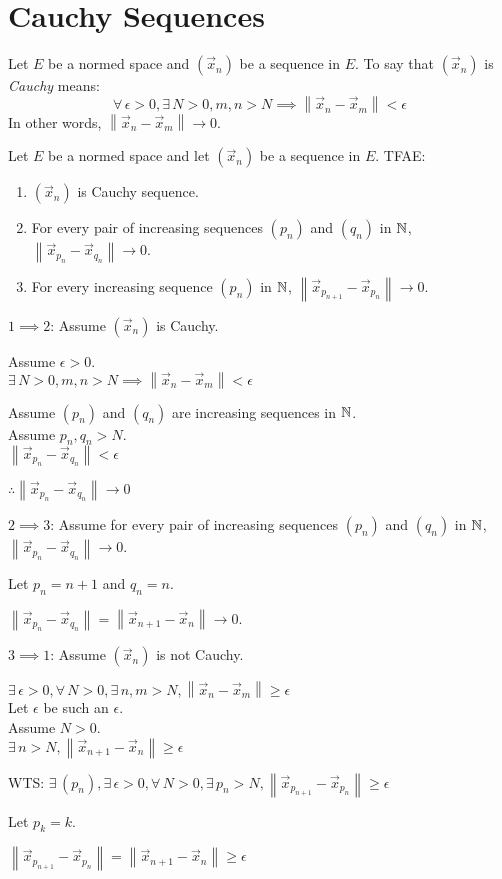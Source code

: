 \documentclass[letterpaper,12pt,fleqn]{article}
\newcommand{\vx}{\vec{x}}
\newcommand{\e}{\epsilon}
\newcommand{\norm}[1]{\left\|#1\right\|}
\begin{document}
\section*{Cauchy Sequences}

\begin{definition}[Cauchy]
  Let $E$ be a normed space and $(\vx_n)$ be a sequence in $E$. To say that
  $(\vx_n)$ is \emph{Cauchy} means:
  \[\forall\,\e>0,\exists\,N>0,m,n>N\implies\norm{\vx_n-\vx_m}<\e\]
  In other words, $\norm{\vx_n-\vx_m}\to0$.
\end{definition}

\begin{theorem}
  Let $E$ be a normed space and let $(\vx_n)$ be a sequence in $E$. TFAE:
  \begin{enumerate}
  \item $(\vx_n)$ is Cauchy sequence.
  \item For every pair of increasing sequences $(p_n)$ and $(q_n)$ in $\mathbb{N}$,
    $\norm{\vx_{p_n}-\vx_{q_n}}\to0$.
  \item For every increasing sequence $(p_n)$ in $\mathbb{N}$,
    $\norm{\vx_{p_{n+1}}-\vx_{p_n}}\to0$.
  \end{enumerate}
\end{theorem}

\begin{theproof}
  \listbreak
  \begin{description}
  \item $1\implies2$: Assume $(\vx_n)$ is Cauchy.

    Assume $\e>0$. \\
    $\exists\,N>0,m,n>N\implies\norm{\vx_n-\vx_m}<\e$

    Assume $(p_n)$ and $(q_n)$ are increasing sequences in $\mathbb{N}$. \\
    Assume $p_n,q_n>N$. \\
    $\norm{\vx_{p_n}-\vx_{q_n}}<\e$

    $\therefore\norm{\vx_{p_n}-\vx_{q_n}}\to0$

  \item $2\implies3$: Assume for every pair of increasing sequences $(p_n)$ and
    $(q_n)$ in $\mathbb{N}$, $\norm{\vx_{p_n}-\vx_{q_n}}\to0$.

    Let $p_n=n+1$ and $q_n=n$.

    $\norm{\vx_{p_n}-\vx_{q_n}}=\norm{\vx_{n+1}-\vx_n}\to0$.

  \item $3\implies1$: Assume $(\vx_n)$ is not Cauchy.

    $\exists\,\e>0,\forall\,N>0,\exists\,n,m>N,\norm{\vx_n-\vx_m}\ge\e$ \\
    Let $\e$ be such an $\e$. \\
    Assume $N>0$. \\
    $\exists\,n>N,\norm{\vx_{n+1}-\vx_n}\ge\e$

    WTS: $\exists\,(p_n),\exists\,\e>0,\forall\,N>0,\exists\,p_n>N,
    \norm{\vx_{p_{n+1}}-\vx_{p_n}}\ge\e$

    Let $p_k=k$.

    $\norm{\vx_{p_{n+1}}-\vx_{p_n}}=\norm{\vx_{n+1}-\vx_n}\ge\e$
  \end{description}
\end{theproof}
\end{document}

